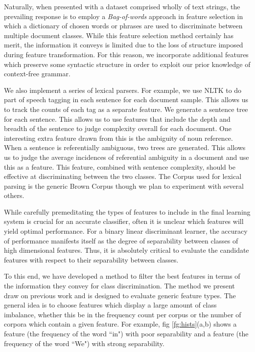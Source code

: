 
Naturally, when presented with a dataset comprised wholly of text strings, the prevailing response is to employ a \emph{Bag-of-words} approach in feature selection in which a dictionary of chosen words or phrases are used to discriminate between multiple document classes. While this feature selection method certainly has merit, the information it conveys is limited due to the loss of structure imposed during feature transformation. For this reason, we incorporate additional features which preserve some syntactic structure in order to exploit our prior knowledge of context-free grammar.

We also implement a series of lexical parsers.  For example, we use NLTK to do part of speech tagging in each sentence for each document sample.  This allows us to track the counts of each tag as a separate feature.  We generate a sentence tree for each sentence.  This allows us to use features that include the depth and breadth of the sentence to judge complexity overall for each document.  One interesting extra feature drawn from this is the ambiguity of noun reference.  When a sentence is referentially ambiguous, two trees are generated.  This allows us to judge the average incidences of referential ambiguity in a document and use this as a feature.  This feature, combined with sentence complexity, should be effective at discriminating between the two classes.  The Corpus used for lexical parsing is the generic Brown Corpus though we plan to experiment with several others.

While carefully premeditating the types of features to include in the final learning system is crucial for an accurate classifier, often it is unclear which features will yield optimal performance. For a binary linear discriminant learner, the accuracy of performance manifests itself as the degree of separability between classes of high dimensional features. Thus, it is absolutely critical to evaluate the candidate features with respect to their separability between classes.

To this end, we have developed a method to filter the best features in terms of the information they convey for class discrimination. The method we present draw on previous work and is designed to evaluate generic feature types.
The general idea is to choose features which display a large amount of class imbalance, whether this be in the frequency count per corpus or the number of corpora which contain a given feature. For example,  fig \ref{fg:hists}(a,b) shows a feature (the frequency of the word ``in") with poor separability and a feature (the frequency of the word ``We") with strong separability.

